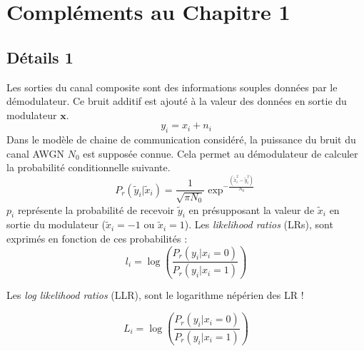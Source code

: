 

{
\appendix

\chapter{Compléments au Chapitre 1}
\section{Détails 1}\label{append:decoding_nodes}
}
{
\label{append:decoding_nodes}
}

Les sorties du canal composite sont des informations souples données par le démodulateur.
Ce bruit additif est ajouté à la valeur des données en sortie du modulateur $\mathbold{x}$.
\begin{equation}
y_i = x_i + n_i
\end{equation}
Dans le modèle de chaine de communication considéré, la puissance du bruit du canal AWGN $N_0$ est supposée connue.
Cela permet au démodulateur de calculer la probabilité conditionnelle suivante.
\begin{equation}
	P_r( \tilde{y}_i|\tilde{x}_i) = \dfrac{1}{\sqrt{\pi N_0}}\exp^{-\tfrac{(\tilde{x}_i^2-\tilde{y}_i^2)}{N_0}}
\end{equation}
$p_i$ représente la probabilité de recevoir $\tilde{y}_i$ en présupposant la valeur de $\tilde{x}_i$ en sortie du modulateur ($\tilde{x}_i=-1$ ou $\tilde{x}_i=1$). Les \textit{likelihood ratios} (LRs), sont exprimés en fonction de ces probabilités :
\begin{equation}
	l_i = \log\left(\dfrac{P_r(y_i | x_i = 0)}{P_r(y_i | x_i = 1)}\right)
\end{equation}
\label{eq:lr}

Les \textit{log likelihood ratios} (LLR), sont le logarithme népérien des LR ! 

\begin{equation}
  L_i = \log\left(\dfrac{P_r(y_i | x_i = 0)}{P_r(y_i | x_i = 1)}\right)
\end{equation}
\label{eq:llr}


